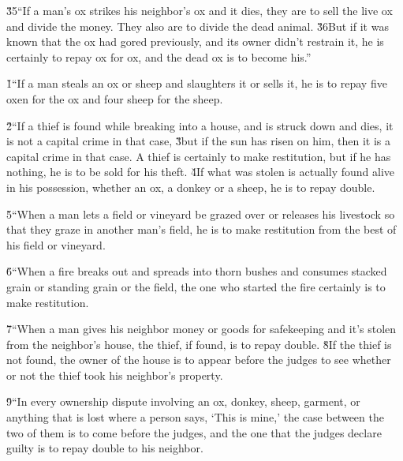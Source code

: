 \v{35}``If a man's ox strikes his neighbor's ox and it dies, they are to sell the live ox and divide the money. They also are to divide the dead animal. \v{36}But if it was known that the ox had gored previously, and its owner didn't restrain it, he is certainly to repay ox for ox, and the dead ox is to become his.''

\v{1}``If a man steals an ox or sheep and slaughters it or sells it, he is to repay five oxen for the ox and four sheep for the sheep.

\v{2}``If a thief is found while breaking into a house, and is struck down and dies, it is not a capital crime in that case, \v{3}but if the sun has risen on him, then it is a capital crime in that case. A thief is certainly to make restitution, but if he has nothing, he is to be sold for his theft. \v{4}If what was stolen is actually found alive in his possession, whether an ox, a donkey or a sheep, he is to repay double.

\v{5}``When a man lets a field or vineyard be grazed over or releases his livestock so that they graze in another man's field, he is to make restitution from the best of his field or vineyard.

\v{6}``When a fire breaks out and spreads into thorn bushes and consumes stacked grain or standing grain or the field, the one who started the fire certainly is to make restitution.

\v{7}``When a man gives his neighbor money or goods for safekeeping and it's stolen from the neighbor's house, the thief, if found, is to repay double. \v{8}If the thief is not found, the owner of the house is to appear before the judges to see whether or not the thief took his neighbor's property.

\v{9}``In every ownership dispute involving an ox, donkey, sheep, garment, or anything that is lost where a person says, `This is mine,' the case between the two of them is to come before the judges, and the one that the judges declare guilty is to repay double to his neighbor.


